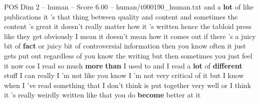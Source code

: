 \begin{textsample}{POS Dim 2 – human – Score 6.00 – human/t000190\_human.txt}  \label{ex:f2_pos_033}
and a \textbf{lot} of like publications it 's that thing between quality and content and sometimes the content 's great it doesn't really matter how it 's written hence the tabloid press like they get obviously I mean it doesn't mean how it comes out if there 's a juicy bit of \textbf{fact} or juicy bit of controversial information then you know often it just gets put out regardless of you know the writing but then sometimes you just feel it now cos I read so much \textbf{more} \textbf{than} I used to and I read a \textbf{lot} of \textbf{different} stuff I can really I 'm not like you know I 'm not very critical of it but I know when I 've read something that I don't think is put together very well or I think it 's really weirdly written like that you do \textbf{become} better at it

\end{textsample}
